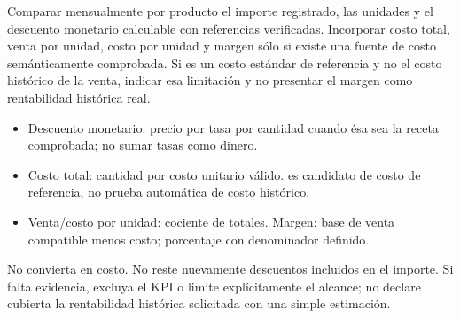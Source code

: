 \label{aw06}
\begin{goal}
Comparar mensualmente por producto el importe registrado, las unidades y el descuento monetario calculable con referencias verificadas. Incorporar costo total, venta por unidad, costo por unidad y margen sólo si existe una fuente de costo semánticamente comprobada. Si es un costo estándar de referencia y no el costo histórico de la venta, indicar esa limitación y no presentar el margen como rentabilidad histórica real.
\end{goal}
\begin{itemize}
\item Descuento monetario: precio por tasa por cantidad cuando ésa sea la receta comprobada; no sumar tasas como dinero.
\item Costo total: cantidad por costo unitario válido.  es candidato de costo de referencia, no prueba automática de costo histórico.
\item Venta/costo por unidad: cociente de totales. Margen: base de venta compatible menos costo; porcentaje con denominador definido.
\end{itemize}
\begin{note}
No convierta  en costo. No reste nuevamente descuentos incluidos en el importe. Si falta evidencia, excluya el KPI o limite explícitamente el alcance; no declare cubierta la rentabilidad histórica solicitada con una simple estimación.
\end{note}

